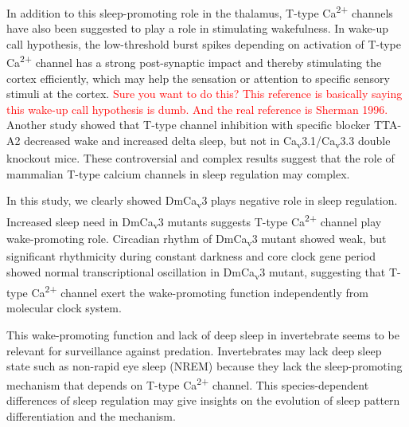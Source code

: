In addition to this sleep-promoting role in the thalamus, T-type Ca\textsuperscript{2+} channels have also been suggested to play a role in stimulating wakefulness.
In wake-up call hypothesis, the low-threshold burst spikes depending on activation of T-type Ca\textsuperscript{2+} channel has a strong post-synaptic impact and thereby stimulating the cortex efficiently\cite{swadlow:2001aa}, which may help the sensation or attention to specific sensory stimuli at the cortex.
\textcolor{red}{Sure you want to do this? This reference is basically saying this wake-up call hypothesis is dumb. And the real reference is Sherman 1996.}
Another study showed that T-type channel inhibition with specific blocker TTA-A2 decreased wake and increased delta sleep, but not in Ca\textsubscript{v}3.1/Ca\textsubscript{v}3.3 double knockout mice\cite{kraus:2010aa}.
These controversial and complex results suggest that the role of mammalian T-type calcium channels in sleep regulation may complex. 

In this study, we clearly showed DmCa\textsubscript{v}3 plays negative role in sleep regulation.
Increased sleep need in DmCa\textsubscript{v}3 mutants suggests T-type Ca\textsuperscript{2+} channel play wake-promoting role.
Circadian rhythm of DmCa\textsubscript{v}3 mutant showed weak, but significant rhythmicity during constant darkness and core clock gene period showed normal transcriptional oscillation in DmCa\textsubscript{v}3 mutant, suggesting that T-type Ca\textsuperscript{2+} channel exert the wake-promoting function independently from molecular clock system.

This wake-promoting function and lack of deep sleep in invertebrate seems to be relevant for surveillance against predation.
Invertebrates may lack deep sleep state such as non-rapid eye sleep (NREM) because they lack the sleep-promoting mechanism that depends on T-type Ca\textsuperscript{2+} channel.
This species-dependent differences of sleep regulation may give insights on the evolution of sleep pattern differentiation and the mechanism.
  
  
  
  
  
  
  
  